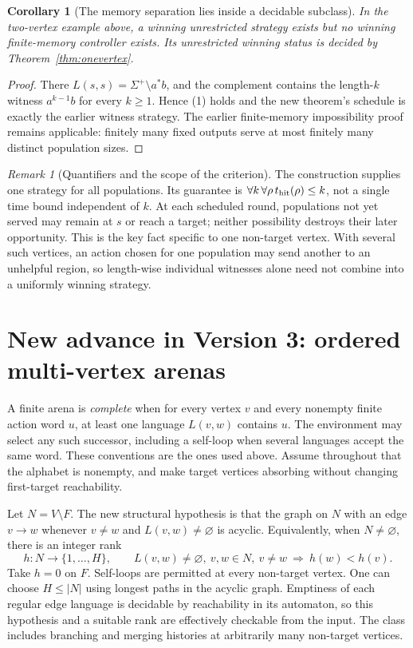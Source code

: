 \documentclass[11pt]{article}
\newtheorem{corollary}{Corollary}
\theoremstyle{definition}
\theoremstyle{remark}
\newtheorem{remark}{Remark}
\begin{document}
\begin{corollary}[The memory separation lies inside a decidable subclass]
In the two-vertex example above, a winning unrestricted strategy exists but
no winning finite-memory controller exists. Its unrestricted winning status
is decided by Theorem~\ref{thm:onevertex}.
\end{corollary}
\begin{proof}
There $L(s,s)=\Sigma^+\setminus a^*b$, and the complement contains the
length-$k$ witness $a^{k-1}b$ for every $k\geq1$. Hence (1) holds and the
new theorem's schedule is exactly the earlier witness strategy.
The earlier finite-memory impossibility proof remains applicable: finitely
many fixed outputs serve at most finitely many distinct population sizes.
\end{proof}

\begin{remark}[Quantifiers and the scope of the criterion]
The construction supplies one strategy for all populations. Its guarantee is
$\forall k\,\forall\rho\, t_{\rm hit}(\rho)\leq k$, not a single time bound
independent of $k$. At each scheduled round, populations not yet served may
remain at $s$ or reach a target; neither possibility destroys their later
opportunity. This is the key fact specific to one non-target vertex.
With several such vertices, an action chosen for one population may send
another to an unhelpful region, so length-wise individual witnesses alone
need not combine into a uniformly winning strategy.
\end{remark}

\section{New advance in Version 3: ordered multi-vertex arenas}
A finite arena is \emph{complete} when for every vertex $v$ and every
nonempty finite action word $u$, at least one language $L(v,w)$ contains
$u$. The environment may select any such successor, including a self-loop
when several languages accept the same word. These conventions are the
ones used above. Assume throughout that the alphabet is nonempty, and make
target vertices absorbing without changing first-target reachability.

Let $N=V\setminus F$. The new structural hypothesis is that the graph on
$N$ with an edge $v\to w$ whenever $v\ne w$ and $L(v,w)\ne\varnothing$
is acyclic. Equivalently, when $N\ne\varnothing$, there is an integer rank
\[
 h:N\to\{1,\ldots,H\},\qquad
 L(v,w)\ne\varnothing,\ v,w\in N,\ v\ne w
       \ \Longrightarrow\ h(w)<h(v).                 \tag{2}
\]
Take $h=0$ on $F$. Self-loops are permitted at every non-target vertex.
One can choose $H\leq|N|$ using longest paths in the acyclic graph. Emptiness
of each regular edge language is decidable by reachability in its automaton,
so this hypothesis and a suitable rank are effectively checkable from the
input. The class includes branching and merging histories at arbitrarily
many non-target vertices.
\end{document}
